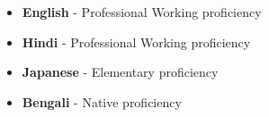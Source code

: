 \documentclass[9pt]{developercv} %
\begin{document}
\vspace{-10 pt}
    \vspace{-6pt}
    
    \begin{minipage}{0.45\textwidth}
        \begin{itemize}[noitemsep]
            \item \textbf{English} - Professional Working proficiency
            \item \textbf{Hindi} - Professional Working proficiency
        \end{itemize}    
    \end{minipage}
    \hfill
    \begin{minipage}{0.45\textwidth}
        \begin{itemize}[noitemsep]
            \item \textbf{Japanese} - Elementary proficiency
            \item \textbf{Bengali} - Native proficiency
        \end{itemize}            
    \end{minipage}


\end{document}

